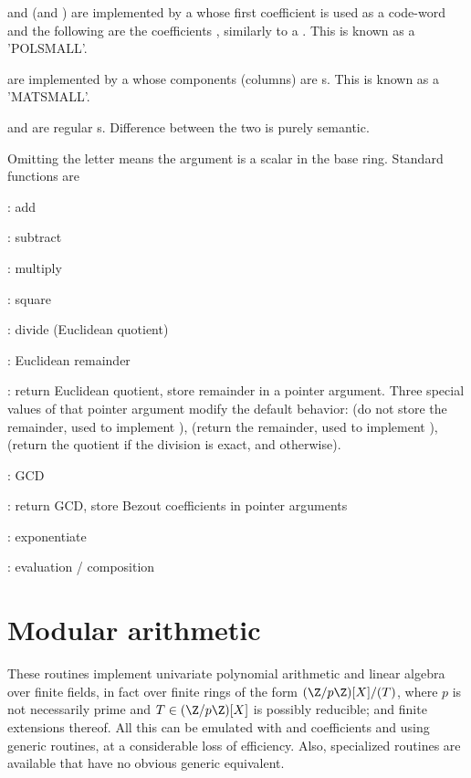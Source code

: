    and  (and ) are implemented by a  whose
  first coefficient is used as a code-word and the following are the
  coefficients , similarly to a . This is known as a 'POLSMALL'.

   are implemented by a  whose components (columns) are
  s. This is known as a 'MATSMALL'.

   and  are regular s. Difference between the
  two is purely semantic.

\noindent Omitting the letter means the argument is a scalar in the base
ring. Standard functions  are

  : add

  : subtract

  : multiply

  : square

  : divide (Euclidean quotient)

  : Euclidean remainder

  : return Euclidean quotient, store remainder in a pointer
argument. Three special values of that pointer argument modify the default
behavior:  (do not store the remainder, used to implement
),  (return the remainder, used to implement
),  (return the quotient if the division is exact,
and  otherwise).

  : GCD

  : return GCD, store Bezout coefficients in pointer arguments

  : exponentiate

  : evaluation / composition


\section{Modular arithmetic}

\noindent These routines implement univariate polynomial arithmetic and
linear algebra over finite fields, in fact over finite rings of the form
$(\Z/p\Z)[X]/(T)$, where $p$ is not necessarily prime and $T\in(\Z/p\Z)[X]$ is
possibly reducible; and finite extensions thereof. All this can be emulated
with  and  coefficients and using generic routines,
at a considerable loss of efficiency. Also, specialized routines are
available that have no obvious generic equivalent.

